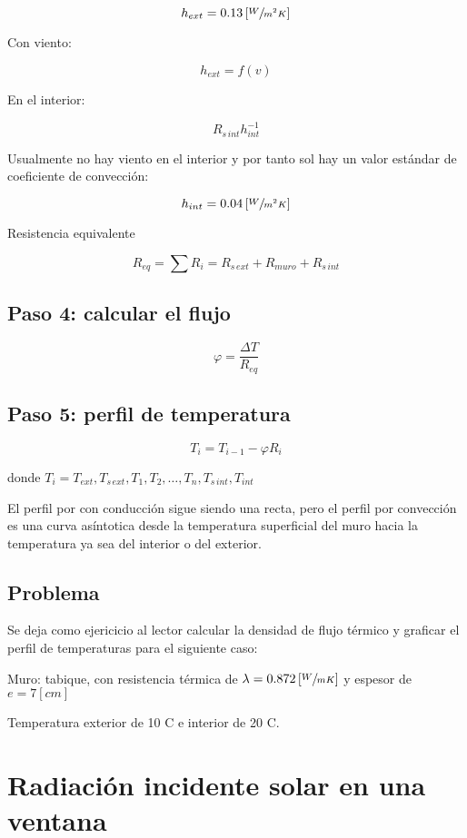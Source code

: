 \documentclass[12pt]{article}
\begin{document}
\[ h_{ ext } = 0.13 \left[ \sfrac{ W }{ m ^ 2 K } \right] \]

Con viento:

\[ h_{ ext } = f \left( v \right) \]

En el interior:

\[ R_{ s \, int } h_{ int } ^{ -1 } \]

Usualmente no hay viento en el interior y por tanto sol hay un valor estándar de coeficiente de convección:

\[ h_{ int } = 0.04 \left[ \sfrac{ W }{ m ^ 2 K } \right] \]

Resistencia equivalente

\[ R_{ eq } = \sum{ R_i } = R_{ s \, ext } + R_{ muro } + R_{ s \, int } \]

\subsection{Paso 4: calcular el flujo}

\[ \varphi = \frac{ \Delta T }{ R_{ eq } } \]

\subsection{Paso 5: perfil de temperatura}

\[ T_i = T_{ i - 1 } - \varphi R_i \]

donde $ T_i = T_{ ext }, T_{ s \, ext }, T_1, T_2, \ldots , T_n, T_{s \, int }, T_{ int } $

El perfil por con conducción sigue siendo una recta, pero el perfil por convección es una curva asíntotica desde la temperatura superficial del muro hacia la temperatura ya sea del interior o del exterior.

\subsection*{ Problema }

Se deja como ejericicio al lector calcular la densidad de flujo térmico y graficar el perfil de temperaturas para el siguiente caso:

Muro: tabique, con resistencia térmica de $ \lambda = 0.872 \left[ \sfrac{ W }{ m K } \right] $ y espesor de $ e = 7 \left[ cm \right]$

Temperatura exterior de 10 \degree C e interior de 20 \degree C.

\section{Radiación incidente solar en una ventana}
\end{document}
